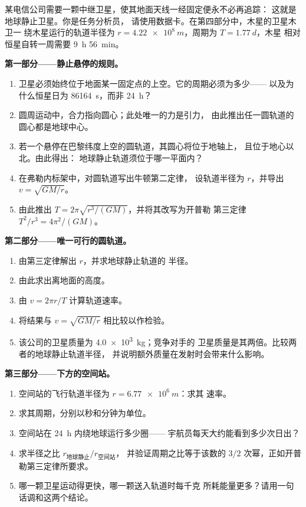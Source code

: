 \begin{problem}
\label{pb:g12:satellites-kepler:1}
某电信公司需要一颗中继卫星，使其地面天线一经固定便永不必再追踪：
这就是地球静止卫星。你是任务分析员，
请使用数据卡。在第四部分中，木星的卫星木卫一
绕木星运行的轨道半径为 $r = \qty{4.22e8}{m}$，周期为 $T = \qty{1.77}{d}$，木星
相对恒星自转一周需要 \qty{9}{h} \qty{56}{min}。

\medskip
\noindent\textbf{第一部分——静止悬停的规则。}
\begin{enumerate}
  \item 卫星必须始终位于地面某一固定点的上空。它的周期必须为多少——
        以及为什么恒星日为
        \qty{86164}{s}，而非 \qty{24}{h}？
  \item 圆周运动中，合力指向圆心；此处唯一的力是引力，
        由此推出任一圆轨道的
        圆心都是地球中心。
  \item 若一个悬停在巴黎纬度上空的圆轨道，其圆心将位于地轴上，
        且位于地心以北。由此得出：
        地球静止轨道须位于哪一平面内？
  \item 在弗勒内标架中，对圆轨道写出牛顿第二定律，
        设轨道半径为 $r$，并导出 $v = \sqrt{GM/r}$。
  \item 由此推出 $T = 2\pi\sqrt{r^3/(GM)}$，并将其改写为开普勒
        第三定律 $T^2/r^3 = 4\pi^2/(GM)$。
\end{enumerate}

\medskip
\noindent\textbf{第二部分——唯一可行的圆轨道。}
\begin{enumerate}[resume]
  \item 由第三定律解出 $r$，并求地球静止轨道的
        半径。
  \item 由此求出离地面的高度。
  \item 由 $v = 2\pi r/T$ 计算轨道速率。
  \item 将结果与 $v = \sqrt{GM/r}$ 相比较以作检验。
  \item 该公司的卫星质量为 \qty{4.0e3}{kg}；竞争对手的
        卫星质量是其两倍。比较两者的地球静止轨道半径，
        并说明额外质量在发射时会带来什么影响。
\end{enumerate}

\medskip
\noindent\textbf{第三部分——下方的空间站。}
\begin{enumerate}[resume]
  \item 空间站的飞行轨道半径为 $r = \qty{6.77e6}{m}$：求其
        速率。
  \item 求其周期，分别以秒和分钟为单位。
  \item 空间站在 \qty{24}{h} 内绕地球运行多少圈——
        宇航员每天大约能看到多少次日出？
  \item 求半径之比 $r_{\text{地球静止}}/r_{\text{空间站}}$，
        并验证周期之比等于该数的
        $3/2$ 次幂，正如开普勒第三定律所要求。
  \item 哪一颗卫星运动得更快，哪一颗送入轨道时每千克
        所耗能量更多？请用一句话调和这两个结论。
\end{enumerate}


\end{problem}
